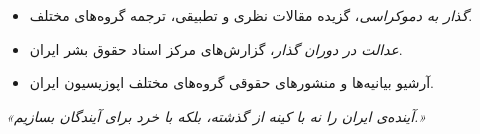 \begin{itemize}
    \item \textit{گذار به دموکراسی}، گزیده مقالات نظری و تطبیقی، ترجمه گروه‌های مختلف.
    \item \textit{عدالت در دوران گذار}، گزارش‌های مرکز اسناد حقوق بشر ایران.
    \item آرشیو بیانیه‌ها و منشورهای حقوقی گروه‌های مختلف اپوزیسیون ایران.
\end{itemize}

\vfill
\begin{center}
\small
\textit{«آینده‌ی ایران را نه با کینه از گذشته، بلکه با خرد برای آیندگان بسازیم.»}
\end{center}
